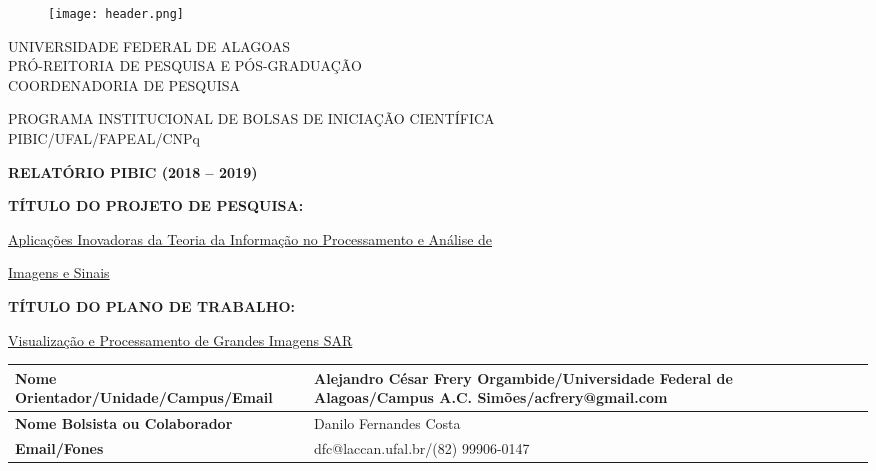\documentclass[12pt,letterpaper]{article}
\begin{document}
\onehalfspacing 
\thispagestyle{empty}
\begin{center}
\vspace{0.2cm}

\begin{figure}
    \centering
    \texttt{[image: header.png]}
\end{figure}
\vspace{-1cm}
\hrulefill

UNIVERSIDADE FEDERAL DE ALAGOAS\\
PRÓ-REITORIA DE PESQUISA E PÓS-GRADUAÇÃO\\
COORDENADORIA DE PESQUISA

\hrulefill

\vspace{0.5cm}

PROGRAMA INSTITUCIONAL DE BOLSAS DE INICIAÇÃO CIENTÍFICA\\PIBIC/UFAL/FAPEAL/CNPq

\vspace{1.0cm}

\textbf{RELATÓRIO PIBIC (2018 -- 2019)}\\

\end{center}

\vspace{1.2cm}

\textbf{TÍTULO DO PROJETO DE PESQUISA:}

\underline{Aplicações Inovadoras da Teoria da Informação no Processamento e Análise de}

\underline{Imagens e Sinais}

\textbf{TÍTULO DO PLANO DE TRABALHO:}

\underline{Visualização e Processamento de Grandes Imagens SAR}

\vspace{1cm}

\begin{table}[!h]
\begin{center}
\begin{tabularx}{\textwidth}{|X|X|X|}
\hline                              
\textbf{Nome Orientador/Unidade/Campus/Email} &  Alejandro César Frery Orgambide/Universidade Federal de Alagoas/Campus A.C. Simões/acfrery@gmail.com\\
\hline     
\textbf{Nome Bolsista ou Colaborador} & Danilo Fernandes Costa\\
\hline     
\textbf{Email/Fones} & dfc@laccan.ufal.br/(82) 99906-0147\\
\hline     
\end{tabularx}
\end{center}
\end{table}
\end{document}
